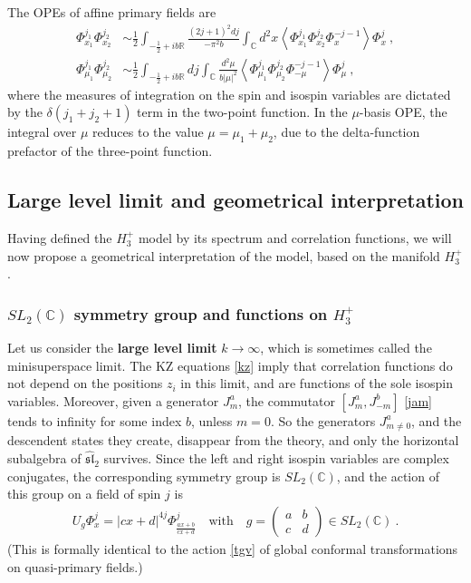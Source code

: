 \documentclass[12pt, a4paper, notitlepage, twoside]{report}
\numberwithin{equation}{section}
\theoremstyle{break}
\begin{document}
The OPEs of affine primary fields are
\begin{align}
 \Phi^{j_1}_{x_1}\Phi^{j_2}_{x_2} &\sim \frac12 \int_{-\frac12 + ib\mathbb{R}} \frac{(2j+1)^2 dj}{-\pi^2b}\int_{{\mathbb{C}}}d^2x \left\langle \Phi^{j_1}_{x_1}\Phi^{j_2}_{x_2} \Phi^{-j-1}_{x} \right\rangle \Phi^j_{x}\ ,
\label{xope}
\\
\Phi^{j_1}_{\mu_1}\Phi^{j_2}_{\mu_2} &\sim \frac12 \int_{-\frac12 + ib\mathbb{R}} dj\int_{{\mathbb{C}}}\frac{d^2\mu}{b|\mu|^2} \left\langle \Phi^{j_1}_{\mu_1}\Phi^{j_2}_{\mu_2} \Phi^{-j-1}_{-\mu} \right\rangle \Phi^j_{\mu}\ , 
\label{mope}
\end{align}
where the measures of integration on the spin and isospin variables are dictated by the $\delta(j_1+j_2+1)$ term in the two-point function.
In the $\mu$-basis OPE, the integral over $\mu$ reduces to the value $\mu=\mu_1+\mu_2$, due to the delta-function prefactor of the three-point function. 


\subsection{Large level limit and geometrical interpretation}

Having defined the $H_3^+$ model by its spectrum and correlation functions, we will now propose a geometrical interpretation of the model, based on the manifold $H_3^+$.

\subsubsection{$SL_2({\mathbb{C}})$ symmetry group and functions on $H_3^+$}

Let us consider the \textbf{\boldmath large level limit} $k\to \infty$, which is sometimes called the minisuperspace limit. 
The KZ equations \eqref{kz} imply that correlation functions do not depend on the positions $z_i$ in this limit, and are functions of the sole isospin variables. 
Moreover, given a generator $J^a_m$, the commutator $[J^a_m,J^b_{-m}]$ \eqref{jam}  tends to infinity for some index $b$, unless $m=0$. 
So the generators $J^a_{m\neq 0}$, and the descendent states they create, disappear from the theory, and only the horizontal subalgebra of $\widehat{\mathfrak{sl}}_2$ survives.
Since the left and right isospin variables are complex conjugates, the corresponding symmetry group is $SL_2({\mathbb{C}})$, and the action of this group on a field of spin $j$ is 
\begin{align}
 U_g\Phi^j_{x} = |cx+d|^{4j}\Phi^j_{\frac{ax+b}{cx+d}} \quad \text{with} \quad g = \left(\begin{array}{cc} a & b \\ c & d \end{array}\right) \in SL_2({\mathbb{C}})\ .
\label{ugp}
\end{align}
(This is formally identical to the action \eqref{tgv} of global conformal transformations on quasi-primary fields.)
\end{document}
